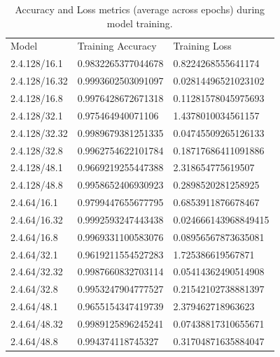 \documentclass[12pt]{article}
\begin{document}
\begin{table}[H]
\centering
\begin{tabular}{lll}
Model & Training Accuracy & Training Loss \\
  2.4.128/16.1    &      0.9832265377044678       &     0.8224268555641174 \\
  2.4.128/16.32    &      0.9993602503091097       &     0.02814496521023102 \\
  2.4.128/16.8    &      0.9976428672671318       &     0.11281578045975693 \\
  2.4.128/32.1    &      0.975464940071106       &     1.4378010034561157 \\
  2.4.128/32.32    &      0.9989679381251335       &     0.04745509265126133 \\
  2.4.128/32.8    &      0.9962754622101784       &     0.18717686411091886 \\
  2.4.128/48.1    &      0.9669219255447388       &     2.318654775619507 \\
  2.4.128/48.8    &      0.9958652406930923       &     0.2898520281258925 \\
  2.4.64/16.1    &      0.9799447655677795       &     0.6853911876678467 \\
  2.4.64/16.32    &      0.9992593247443438       &     0.024666143968849415 \\
  2.4.64/16.8    &      0.9969331100583076       &     0.08956567873635081 \\
  2.4.64/32.1    &      0.9619211554527283       &     1.725386619567871 \\
  2.4.64/32.32    &      0.9987660832703114       &     0.05414362490514908 \\
  2.4.64/32.8    &      0.9953247904777527       &     0.21542102738881397 \\
  2.4.64/48.1    &      0.9655154347419739       &     2.379462718963623 \\
  2.4.64/48.32    &      0.9989125896245241       &     0.07438817310655671 \\
  2.4.64/48.8    &      0.994374118745327       &     0.31704871635884047 \\
\end{tabular}
\caption{Accuracy and Loss metrics (average across epochs) during model training.}
\label{tab:training-metrics}
\end{table}
\end{document}
